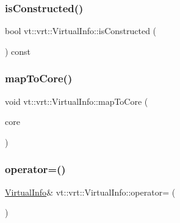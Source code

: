 \subsubsection{\texorpdfstring{is\+Constructed()}{isConstructed()}}
{\footnotesize\ttfamily bool vt\+::vrt\+::\+Virtual\+Info\+::is\+Constructed (\begin{DoxyParamCaption}{ }\end{DoxyParamCaption}) const\hspace{0.3cm}{\ttfamily [inline]}}

\mbox{\label{structvt_1_1vrt_1_1_virtual_info_a69fa103c7e796005f8032efc33e236cf}} 
\subsubsection{\texorpdfstring{map\+To\+Core()}{mapToCore()}}
{\footnotesize\ttfamily void vt\+::vrt\+::\+Virtual\+Info\+::map\+To\+Core (\begin{DoxyParamCaption}\item[{\hyperlink{namespacevt_a74b11b22c02feaabab8591acc87c7c52}{Core\+Type} const \&}]{core }\end{DoxyParamCaption})\hspace{0.3cm}{\ttfamily [inline]}}

\mbox{\label{structvt_1_1vrt_1_1_virtual_info_a63b12c1dfcbc3c6d34be9100c704dd81}} 
\subsubsection{\texorpdfstring{operator=()}{operator=()}}
{\footnotesize\ttfamily \hyperlink{structvt_1_1vrt_1_1_virtual_info}{Virtual\+Info}\& vt\+::vrt\+::\+Virtual\+Info\+::operator= (\begin{DoxyParamCaption}\item[{\hyperlink{structvt_1_1vrt_1_1_virtual_info}{Virtual\+Info} const \&}]{ }\end{DoxyParamCaption})\hspace{0.3cm}{\ttfamily [delete]}}

